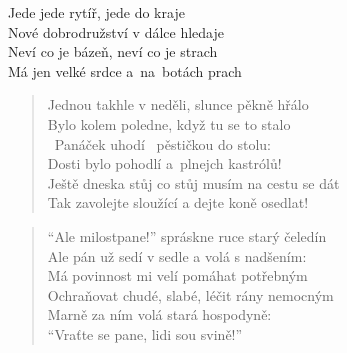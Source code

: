 \begin{song}{}
\begin{refren}
   Jede jede rytíř, jede do kraje \\
   Nové dobrodružství v dálce hledaje \\
   Neví co je bázeň, neví co je strach \\
   Má jen velké srdce a~na~botách prach
\end{refren}
\begin{verse}
   Jednou takhle v neděli, slunce pěkně hřálo \\
   Bylo kolem poledne, když tu se to stalo \\
   ~Panáček uhodí ~pěstičkou do stolu: \\
   Dosti bylo pohodlí a~plnejch kastrólů! \\
   Ještě dneska stůj co stůj musím na cestu se dát \\
   Tak zavolejte sloužící a dejte koně osedlat!
\end{verse}
\begin{verse}
   \enquote{Ale milostpane!} spráskne ruce starý čeledín \\
   Ale pán už sedí v sedle a volá s nadšením: \\
   Má povinnost mi velí pomáhat potřebným \\
   Ochraňovat chudé, slabé, léčit rány nemocným \\
   Marně za ním volá stará hospodyně: \\
   \enquote{Vraťte se pane, lidi sou svině!}
\end{verse}

\chordbreak
\compactbreak


\end{song}
